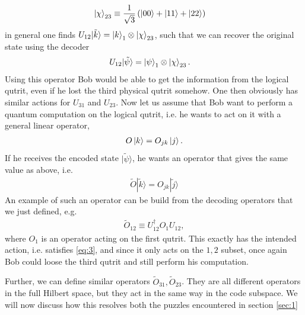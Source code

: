 \documentclass[letter,12pt]{article}
\begin{document}
\begin{equation}
	\begin{aligned}
		\ket{\chi}_{23}&\equiv \frac{1}{\sqrt{3}}\left(\ket{00}+\ket{11}+\ket{22}\right)
	\end{aligned}
\end{equation}
in general one finds $	U_{12}|\tilde k\rangle=\ket{k}_1\otimes \ket{\chi}_{23}$, 
such that we can recover the original state using the decoder
\begin{equation}
	\begin{aligned}
		U_{12}|\tilde \psi\rangle
		&=\ket{\psi}_1\otimes \ket{\chi}_{23}.
	\end{aligned}
\end{equation}
Using this operator Bob would be able to get the information from the logical qutrit, even if he lost the third physical qutrit somehow.
One then obviously has similar actions for $U_{31}$ and $U_{23}$. Now let us assume that Bob want to perform a quantum computation on the logical qutrit, i.e. he wants to act on it with a general linear operator,
\begin{equation}
	\begin{aligned}
		O\ket{k}=O_{jk}\ket{j}.
	\end{aligned}
\end{equation}
If he receives the encoded state $|\tilde \psi\rangle$, he wants an operator that gives the same value as above, i.e.
\begin{equation}
	\begin{aligned} \label{eq:3}
		\tilde{O}|\tilde k\rangle =O_{jk}|\tilde j\rangle 
	\end{aligned}
\end{equation}
An example of such an operator can be build from the decoding operators that we just defined, e.g.
\begin{equation}
	\begin{aligned}
		\tilde{O}_{12}\equiv U^\dagger_{12}O_1 U_{12},
	\end{aligned}
\end{equation}
where $O_1$ is an operator acting on the first qutrit.
This exactly has the intended action, i.e. satisfies \eqref{eq:3}, and since it only acts on the $1,2$ subset, once again Bob could loose the third qutrit and still perform his computation. 

Further, we can define similar operators $\tilde{O}_{31},\tilde{O}_{23}$. They are all different operators in the full Hilbert space, but they act in the same way in the code subspace. We will now discuss how this resolves both the puzzles encountered in section \ref{sec:1}
\end{document}
